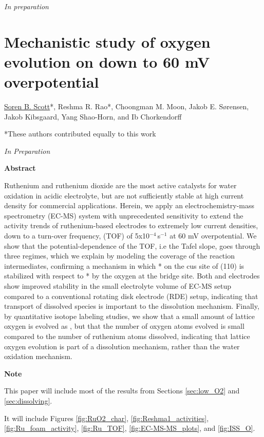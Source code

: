 \begin{flushleft}
		\textit{In preparation}
		
		
		
		
		
				
		\clearpage
		\section[In Preparation - Mechanistic study of oxygen evolution on \ch{RuO2} down to 60 mV overpotential]{Mechanistic study of oxygen evolution on  down to 60 mV overpotential}\label{Scott_Rao2019}
		
		\underline{Soren B. Scott}*, Reshma R. Rao*, Choongman M. Moon, Jakob E. S\o rensen, Jakob Kibsgaard, Yang Shao-Horn, and Ib Chorkendorff
		
		*These authors contributed equally to this work
		
		\textit{In Preparation}
		
		\vspace{5 mm}
		\begin{center}
		\textbf{Abstract}
		\end{center}

		Ruthenium and ruthenium dioxide are the most active catalysts for water oxidation in acidic electrolyte, but are not sufficiently stable at high current density for commercial applications. Herein, we apply an electrochemistry-mass spectrometry (EC-MS) system with unprecedented sensitivity to extend the activity trends of ruthenium-based electrodes to extremely low current densities, down to a turn-over frequency, (TOF) of 5x10$^{-4}\,$s$^{-1}$ at 60 mV overpotential. We show that the potential-dependence of the TOF, i.e the Tafel slope, goes through three regimes, which we explain by modeling the coverage of the reaction intermediates, confirming a mechanism in which * on the cus site of (110) is stabilized with respect to * by the oxygen at the bridge site. Both  and  electrodes show improved stability in the small electrolyte volume of EC-MS setup compared to a conventional rotating disk electrode (RDE) setup, indicating that transport of dissolved species is important to the dissolution mechanism. Finally, by quantitative isotope labeling studies, we show that a small amount of lattice oxygen is evolved as , but that the number of oxygen atoms evolved is small compared to the number of ruthenium atoms dissolved, indicating that lattice oxygen evolution is part of a dissolution mechanism, rather than the water oxidation mechanism.
	
		\vspace{1cm}
		\textbf{Note}
		
		This paper will include most of the results from Sections \ref{sec:low_O2} and \ref{sec:dissolving}.
		
		It will include Figures \ref{fig:RuO2_char}, \ref{fig:Reshma1_activities}, \ref{fig:Ru_foam_activity}, \ref{fig:Ru_TOF}, \ref{fig:EC-MS-MS_plots}, and \ref{fig:ISS_O}.
	

		\end{flushleft}